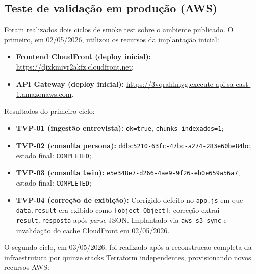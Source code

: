 \subsection{Teste de valida\c{c}\~ao em produ\c{c}\~ao (AWS)}

Foram realizados dois ciclos de smoke test sobre o ambiente publicado.
O primeiro, em 02/05/2026, utilizou os recursos da implanta\c{c}\~ao
inicial:

\begin{itemize}[leftmargin=*]
  \item \textbf{Frontend CloudFront (deploy inicial):}
        \url{https://djxkmivr2akfz.cloudfront.net};
  \item \textbf{API Gateway (deploy inicial):}
        \url{https://3vqrahlmyg.execute-api.sa-east-1.amazonaws.com}.
\end{itemize}

Resultados do primeiro ciclo:

\begin{itemize}[leftmargin=*]
  \item \textbf{TVP-01 (ingest\~ao entrevista):}
        \texttt{ok=true}, \texttt{chunks\_indexados=1};
  \item \textbf{TVP-02 (consulta persona):}
        {\small\nolinkurl{ddbc5210-63fc-47bc-a274-283e60be84bc}},
        estado final: \texttt{COMPLETED};
  \item \textbf{TVP-03 (consulta twin):}
        {\small\nolinkurl{e5e348e7-d266-4ae9-9f26-eb0e659a56a7}},
        estado final: \texttt{COMPLETED};
  \item \textbf{TVP-04 (corre\c{c}\~ao de exibi\c{c}\~ao):}
        Corrigido defeito no \texttt{app.js} em que \texttt{data.result}
        era exibido como \texttt{[object Object]}; corre\c{c}\~ao extrai
        \texttt{result.resposta} ap\'os \textit{parse} JSON.
        Implantado via \texttt{aws s3 sync} e invalida\c{c}\~ao do cache
        CloudFront em 02/05/2026.
\end{itemize}

O segundo ciclo, em 03/05/2026, foi realizado ap\'os a reconstrucao
completa da infraestrutura por quinze stacks Terraform independentes,
provisionando novos recursos AWS:

